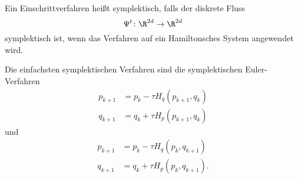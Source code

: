 \begin{definition}
	Ein Einschrittverfahren heißt symplektisch, falls der diskrete Fluss
	\begin{equation*}
		\Psi^t\colon \R^{2d}\to\R^{2d}
	\end{equation*}
	symplektisch ist, wenn das Verfahren auf ein Hamiltonsches System angewendet wird.
\end{definition}

Die einfachsten symplektischen Verfahren sind die symplektischen Euler-Verfahren
\begin{align*}
	p_{k+1} &= p_k - \tau H_q(p_{k+1},q_k) \\
	q_{k+1} &= q_k + \tau H_p(p_{k+1},q_k)
\end{align*}
und
\begin{align*}
	p_{k+1} &= p_k - \tau H_q(p_k,q_{k+1}) \\
	q_{k+1} &= q_k + \tau H_p(p_k,q_{k+1}).
\end{align*}

